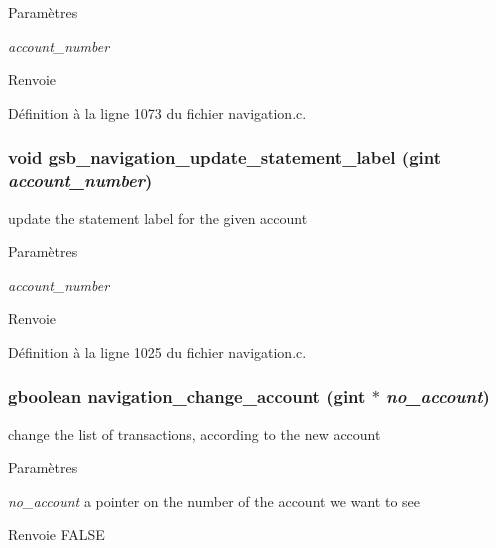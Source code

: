 \begin{DoxyParams}{Paramètres}
\item[{\em account\_\-number}]\end{DoxyParams}
\begin{DoxyReturn}{Renvoie}

\end{DoxyReturn}


Définition à la ligne 1073 du fichier navigation.c.

\subsubsection[{gsb\_\-navigation\_\-update\_\-statement\_\-label}]{\setlength{\rightskip}{0pt plus 5cm}void gsb\_\-navigation\_\-update\_\-statement\_\-label (gint {\em account\_\-number})}\label{navigation_8h_a342b7c00db1370b25971fbc56df7b02e}
update the statement label for the given account


\begin{DoxyParams}{Paramètres}
\item[{\em account\_\-number}]\end{DoxyParams}
\begin{DoxyReturn}{Renvoie}

\end{DoxyReturn}


Définition à la ligne 1025 du fichier navigation.c.

\subsubsection[{navigation\_\-change\_\-account}]{\setlength{\rightskip}{0pt plus 5cm}gboolean navigation\_\-change\_\-account (gint $\ast$ {\em no\_\-account})}\label{navigation_8h_a610fc35ca64e7ce4e22dd7e8cb59549f}
change the list of transactions, according to the new account


\begin{DoxyParams}{Paramètres}
\item[{\em no\_\-account}]a pointer on the number of the account we want to see\end{DoxyParams}
\begin{DoxyReturn}{Renvoie}
FALSE 
\end{DoxyReturn}


